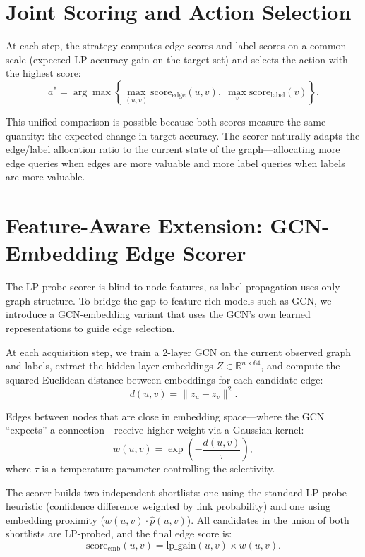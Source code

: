 \documentclass[12pt,a4paper,oneside]{report}
\begin{document}
\section{Joint Scoring and Action Selection}

At each step, the strategy computes edge scores and label scores on a common scale (expected LP accuracy gain on the target set) and selects the action with the highest score:
\begin{equation}
    a^* = \arg\max \left\{ \max_{(u,v)} \text{score}_{\text{edge}}(u,v), \; \max_{v} \text{score}_{\text{label}}(v) \right\}.
\end{equation}

This unified comparison is possible because both scores measure the same quantity: the expected change in target accuracy. The scorer naturally adapts the edge/label allocation ratio to the current state of the graph---allocating more edge queries when edges are more valuable and more label queries when labels are more valuable.

\section{Feature-Aware Extension: GCN-Embedding Edge Scorer}
\label{sec:feat_aware}

The LP-probe scorer is blind to node features, as label propagation uses only graph structure. To bridge the gap to feature-rich models such as GCN, we introduce a GCN-embedding variant that uses the GCN's own learned representations to guide edge selection.

At each acquisition step, we train a 2-layer GCN on the current observed graph and labels, extract the hidden-layer embeddings $Z \in \mathbb{R}^{n \times 64}$, and compute the squared Euclidean distance between embeddings for each candidate edge:
\begin{equation}
    d(u,v) = \|z_u - z_v\|^2.
\end{equation}

Edges between nodes that are close in embedding space---where the GCN ``expects'' a connection---receive higher weight via a Gaussian kernel:
\begin{equation}
    w(u,v) = \exp\!\left(-\frac{d(u,v)}{\tau}\right),
\end{equation}
where $\tau$ is a temperature parameter controlling the selectivity.

The scorer builds two independent shortlists: one using the standard LP-probe heuristic (confidence difference weighted by link probability) and one using embedding proximity ($w(u,v) \cdot \hat{p}(u,v)$). All candidates in the union of both shortlists are LP-probed, and the final edge score is:
\begin{equation}
    \text{score}_{\text{emb}}(u,v) = \text{lp\_gain}(u,v) \times w(u,v).
\end{equation}
\end{document}
